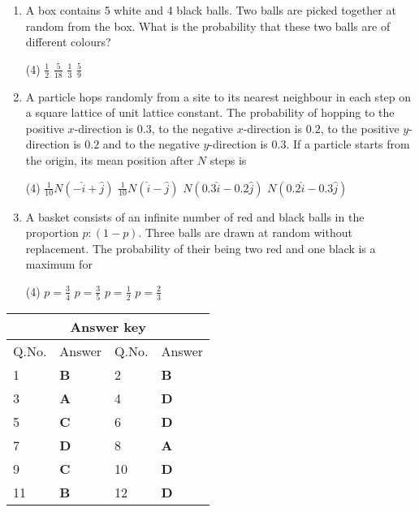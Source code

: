\begin{enumerate}[label=\color{ocre}\textbf{\arabic*.}]
{}
\begin{tasks}(4)
	\task[\textbf{A.}] $\Delta \sqrt{N}$
	\task[\textbf{B.}] $\Delta \sqrt{\frac{9 N}{16}}$
	\task[\textbf{C.}] $\Delta \sqrt{\frac{3 N}{4}}$
	\task[\textbf{D.}] $\Delta \sqrt{\frac{3 N}{8}}$
\end{tasks}
\item A box contains 5 white and 4 black balls. Two balls are picked together at random from the box. What is the probability that these two balls are of different colours?
{}
\begin{tasks}(4)
	\task[\textbf{A.}] $\frac{1}{2}$ 
	\task[\textbf{B.}] $\frac{5}{18}$
	\task[\textbf{C.}] $\frac{1}{3}$
	\task[\textbf{D.}] $\frac{5}{9}$
\end{tasks}
\item  A particle hops randomly from a site to its nearest neighbour in each step on a square lattice of unit lattice constant. The probability of hopping to the positive $x$-direction is $0.3$, to the negative $x$-direction is $0.2$, to the positive $y$-direction is $0.2$ and to the negative $y$-direction is $0.3 .$ If a particle starts from the origin, its mean position after $N$ steps is
{}
\begin{tasks}(4)
	\task[\textbf{A.}] $\frac{1}{10} N(-\hat{i}+\hat{j})$
	\task[\textbf{B.}] $\frac{1}{10} N(\hat{i}-\hat{j})$
	\task[\textbf{C.}] $N(0.3 \hat{i}-0.2 \hat{j})$
	\task[\textbf{D.}] $N(0.2 \hat{i}-0.3 \hat{j})$
\end{tasks}
\item A basket consists of an infinite number of red and black balls in the proportion $p:(1-p)$. Three balls are drawn at random without replacement. The probability of their being two red and one black is a maximum for
{}
\begin{tasks}(4)
	\task[\textbf{A.}]  $p=\frac{3}{4}$
	\task[\textbf{B.}] $p=\frac{3}{5}$
	\task[\textbf{C.}] $p=\frac{1}{2}$
	\task[\textbf{D.}] $p=\frac{2}{3}$
\end{tasks}
\end{enumerate}
\setlength\arrayrulewidth{1pt}
\begin{table}[H]
	\centering
	\begin{tabular}{|p{1.5cm}|p{1.5cm}||p{1.5cm}|p{1.5cm}|}
		\hline
		\multicolumn{4}{|c|}{\textbf{Answer key}}\\\hline\hline
		\rowcolor{ocrel}Q.No.&Answer&Q.No.&Answer\\\hline
		1&\textbf{B} &2&\textbf{B}\\\hline 
		3&\textbf{A} &4&\textbf{D} \\\hline
		5&\textbf{C} &6&\textbf{D} \\\hline
		7&\textbf{D}&8&\textbf{A}\\\hline
		9&\textbf{C}&10&\textbf{D}\\\hline
		11&\textbf{B} &12&\textbf{D}\\\hline
		
	\end{tabular}
\end{table}

